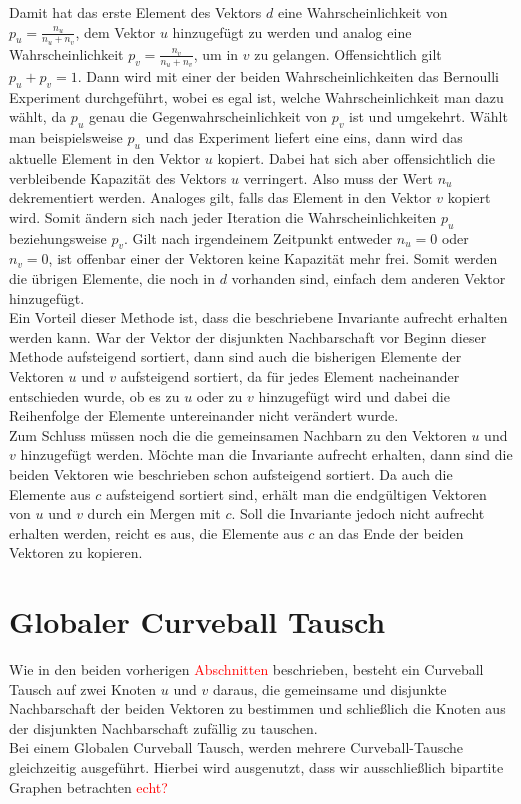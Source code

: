 \documentclass[a4paper]{scrreprt}
\theoremstyle{plain} %
\theoremstyle{definition} %
\begin{document}
Damit hat das erste Element des Vektors $d$ eine Wahrscheinlichkeit von $p_u = \frac{n_u}{n_u+n_v}$, dem
Vektor $u$ hinzugefügt zu werden und analog eine Wahrscheinlichkeit $p_v = \frac{n_v}{n_u+n_v}$, um
in $v$ zu gelangen. Offensichtlich gilt $p_u + p_v = 1$. Dann wird mit einer der beiden
Wahrscheinlichkeiten das Bernoulli Experiment durchgeführt, wobei es egal ist, welche Wahrscheinlichkeit
man dazu wählt, da $p_u$ genau die Gegenwahrscheinlichkeit von $p_v$ ist und umgekehrt. 
Wählt man beispielsweise $p_u$ und das Experiment liefert eine eins, dann wird das aktuelle Element
in den Vektor $u$ kopiert. Dabei
hat sich aber offensichtlich die verbleibende Kapazität des Vektors $u$ verringert. Also muss
der Wert $n_u$ dekrementiert werden. Analoges gilt, falls das Element in den Vektor $v$ kopiert wird.
Somit ändern sich nach jeder Iteration die Wahrscheinlichkeiten $p_u$ beziehungsweise $p_v$.
Gilt nach irgendeinem Zeitpunkt entweder $n_u = 0$ oder $n_v = 0$, ist offenbar einer der Vektoren 
keine Kapazität mehr frei. Somit werden die übrigen Elemente, die noch in $d$ vorhanden sind, 
einfach dem anderen Vektor hinzugefügt.
\\
Ein Vorteil dieser Methode ist, dass die beschriebene Invariante aufrecht erhalten werden kann.
War der Vektor der disjunkten Nachbarschaft vor Beginn dieser Methode aufsteigend sortiert,
dann sind auch die bisherigen Elemente der Vektoren $u$ und $v$ aufsteigend sortiert, da für jedes
Element nacheinander entschieden wurde, ob es zu $u$ oder zu $v$ hinzugefügt wird und dabei die
Reihenfolge der Elemente untereinander nicht verändert wurde.
\\
Zum Schluss müssen noch die die gemeinsamen Nachbarn zu den Vektoren $u$ und $v$ hinzugefügt werden.
Möchte man die Invariante aufrecht erhalten, dann sind die beiden Vektoren wie beschrieben schon
aufsteigend sortiert. Da auch die Elemente aus $c$ aufsteigend sortiert sind, erhält man
die endgültigen Vektoren von $u$ und $v$ durch ein Mergen mit $c$. Soll die Invariante jedoch
nicht aufrecht erhalten werden, reicht es aus, die Elemente aus $c$ an das Ende der beiden Vektoren
zu kopieren.


\section{Globaler Curveball Tausch}
Wie in den beiden vorherigen \textcolor{red}{Abschnitten} beschrieben, besteht ein Curveball Tausch auf zwei Knoten $u$ und $v$ daraus, die gemeinsame und disjunkte Nachbarschaft der beiden Vektoren zu bestimmen
und schließlich die Knoten aus der disjunkten Nachbarschaft zufällig zu tauschen.
\\
Bei einem Globalen Curveball Tausch, werden mehrere Curveball-Tausche gleichzeitig ausgeführt.
Hierbei wird ausgenutzt, dass wir ausschließlich bipartite Graphen betrachten \textcolor{red}{echt?}
\end{document}

